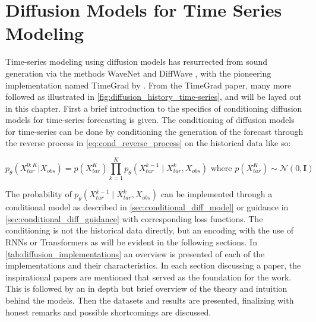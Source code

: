 \section{Diffusion Models for Time Series Modeling} \label{sec:diffusion_time-series}
Time-series modeling using diffusion models has resurrected from sound generation via the methods WaveNet \cite{oord_wavenet_2016} and DiffWave \cite{kong_diffwave_2020}, with the pioneering implementation named TimeGrad by \textcite{rasul_autoregressive_2021}. From the TimeGrad paper, many more followed as illustrated in \autoref{fig:diffusion_history_time-series}, and will be layed out in this chapter. First a brief introduction to the specifics of conditioning diffusion models for time-series forecasting is given. 
The conditioning of diffusion models for time-series can be done by conditioning the generation of the forecast through the reverse process in \autoref{eq:cond_reverse_process} on the historical data like so:

\begin{equation}
 \label{eq:cond_time_reverse_process}
     p_\theta(X_{tar}^{0:K} | X_{obs}) = p(X_{tar}^K)\prod_{k=1}^{K} p_\theta(X_{tar}^{k-1} \mid X_{tar}^k, X_{obs}) \text{ where } p(X_{tar}^K) \sim \mathcal{N}(0, \mathbf{I})
\end{equation}

The probability of $p_\theta(X_{tar}^{k-1} \mid X_{tar}^k, X_{obs})$ can be implemented through a conditional model as described in \ref{sec:conditional_diff_model} or guidance in \ref{sec:conditional_diff_guidance} with corresponding loss functions. The conditioning is not the historical data directly, but an encoding with the use of RNNs or Transformers \cite{vaswani_attention_2017} as will be evident in the following sections.
In \autoref{tab:diffusion_implementations} an overview is presented of each of the implementations and their characteristics. In each section discussing a paper, the inspirational papers are mentioned that served as the foundation for the work. This is followed by an in depth but brief overview of the theory and intuition behind the models. Then the datasets and results are presented, finalizing with honest remarks and possible shortcomings are discussed.

